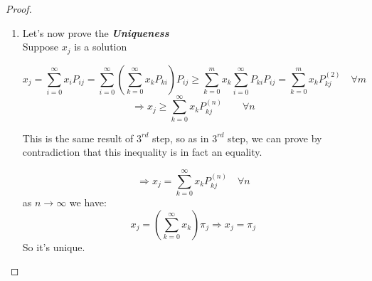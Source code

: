 \begin{proof}
\begin{enumerate}
\item
Let's now prove the \textbf{\textit{Uniqueness}} \\
Suppose $x_j$ is a solution

$$x_j =
 \sum_{i=0}^\infty x_i P_{ij} =
 \sum_{i=0}^\infty ( \sum_{k=0}^\infty x_k P_{ki} ) P_{ij} \geq
 \sum_{k=0}^m x_k \sum_{i=0}^\infty P_{ki} P_{ij} =
 \sum_{k=0}^m x_k P_{kj}^{(2)}
 \quad \forall m
$$
$$ \Rightarrow x_j \geq \sum_{k=0}^\infty x_k P_{kj}^{(n)}\qquad \forall n $$

This is the same result of $3^{rd}$ step, so as in $3^{rd}$ step, we can prove by contradiction that this inequality is in fact an equality.

$$\Rightarrow x_j = \sum_{k=0}^\infty x_k P_{kj}^{(n)} \quad \forall n$$
as $n \to \infty$ we have:
\begin{equation}
x_j = (\sum_{k=0}^\infty x_k ) \pi_j \Rightarrow x_j = \pi_j
\end{equation}
So it's unique.

\end{enumerate}
\end{proof}

